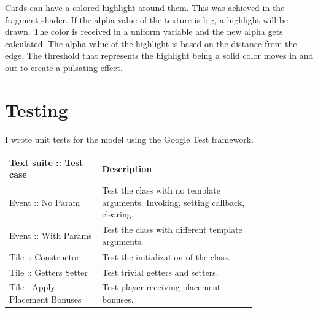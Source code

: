 Cards can have a colored highlight around them. This was achieved in the fragment shader. If the alpha value of the texture is big, a highlight will be drawn. The color is received in a uniform variable and the new alpha gets calculated. The alpha value of the highlight is based on the distance from the edge. The threshold that represents the highlight being a solid color moves in and out to create a pulsating effect.


\section{Testing}

I wrote unit tests for the model using the Google Test framework.

\begin{center}
    \begin{longtable}{ | m{0.3\linewidth} | m{0.5\linewidth} | }
        \hline
        \textbf{Text suite :: Test case} & \textbf{Description} \\
        \hline \hline
        \endhead

        Event :: No Param & Test the class with no template arguments. Invoking, setting callback, clearing. \\
        \hline
        Event :: With Params & Test the class with different template arguments. \\
        \hline

        Tile :: Constructor & Test the initialization of the class. \\
        \hline
        Tile :: Getters Setter & Test trivial getters and setters. \\
        \hline
        Tile : Apply Placement Bonuses & Test player receiving placement bonuses. \\
        \hline


\end{longtable}
\end{center}

